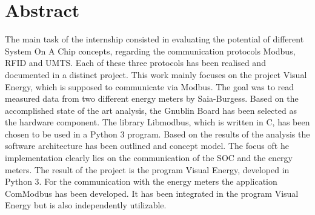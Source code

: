 \documentclass[Bachelorarbeit.tex]{subfiles}
\begin{document}
\chapter*{Abstract}
The main task of the internship consisted in evaluating the potential of different System On A Chip concepts, regarding the communication protocols Modbus, RFID and UMTS. 
Each of these three protocols has been realised and documented in a distinct project. 
This work mainly focuses on the project Visual Energy, which is supposed to communicate via Modbus. 
The goal was to read measured data from two different energy meters by Saia-Burgess. 
Based on the accomplished state of the art analysis, the Gnublin Board has been selected as the hardware component. 
The library Libmodbus, which is written in C, has been chosen to be used in a Python 3 program. 
Based on the results of the analysis the software architecture has been outlined and concept model. 
The focus oft he implementation clearly lies on the communication of the SOC and the energy meters. 
The result of the project is the program Visual Energy, developed in Python 3. 
For the communication with the energy meters the application ComModbus has been developed. 
It has been integrated in the program Visual Energy but is also independently utilizable.
\end{document}

